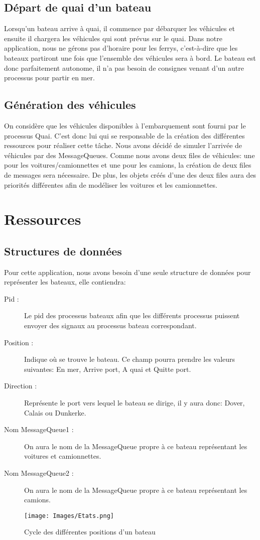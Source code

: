 \documentclass[a4paper, 11pt]{article}
\begin{document}
	\subsection{Départ de quai d'un bateau}
		Lorsqu'un bateau arrive à quai, il commence par débarquer les véhicules et ensuite il chargera les véhicules qui sont prévus sur le quai. Dans notre application, nous ne gérons pas d'horaire pour les ferrys, c'est-à-dire que les bateaux partiront une fois que l'ensemble des véhicules sera à bord. Le bateau est donc parfaitement autonome, il n'a pas besoin de consignes venant d'un autre processus pour partir en mer.
	\subsection{Génération des véhicules}
		On considère que les véhicules disponibles à l'embarquement sont fourni par le processus Quai. C'est donc lui qui se responsable de la création des différentes ressources pour réaliser cette tâche. Nous avons décidé de simuler l'arrivée de véhicules par des MessageQueues. Comme nous avons deux files de véhicules: une pour les voitures/camionnettes et une pour les camions, la création de deux files de messages sera nécessaire. De plus, les objets créés  d'une des deux files aura des priorités différentes afin de modéliser les voitures et les camionnettes.
\section{Ressources}
	\subsection{Structures de données}
		Pour cette application, nous avons besoin d'une seule structure de données pour représenter les bateaux, elle contiendra:
		\begin{description}
			\item[Pid :] Le pid des processus bateaux afin que les différents processus puissent envoyer des signaux au processus bateau correspondant.
			\item[Position :] Indique où se trouve le bateau. Ce champ pourra prendre les valeurs suivantes: En mer, Arrive port, A quai et Quitte port.
			\item[Direction :] Représente le port vers lequel le bateau se dirige, il y aura donc: Dover, Calais ou Dunkerke.
			\item[Nom MessageQueue1 :] On aura le nom de la MessageQueue propre à ce bateau représentant les voitures et camionnettes.
			\item[Nom MessageQueue2 :] On aura le nom de la MessageQueue propre à ce bateau représentant les camions.
		\end{description}
		\begin{figure}[!h]
			\centering
			\texttt{[image: Images/Etats.png]}
			\caption{Cycle des différentes positions d'un bateau}
		\end{figure}
\end{document}
